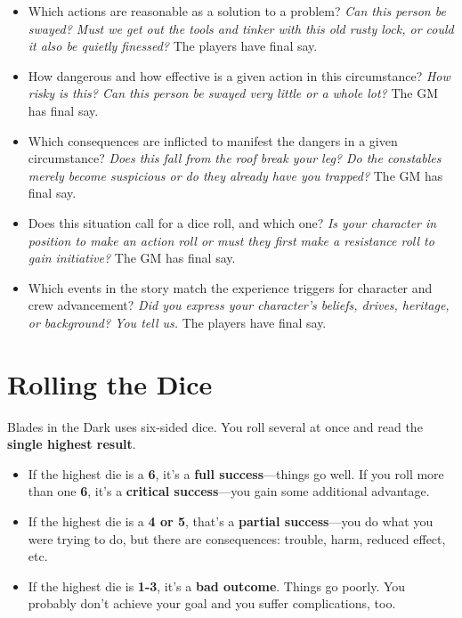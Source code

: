 \documentclass[11pt,oneside]{book}
\begin{document}
\begin{itemize}
	\item Which actions are reasonable as a solution to a problem? \emph{Can this person be swayed? Must we get out the tools and tinker with this old rusty lock, or could it also be quietly finessed?} The players have final say.
	\item How dangerous and how effective is a given action in this circumstance? \emph{How risky is this? Can this person be swayed very little or a whole lot?} The GM has final say.
	\item Which consequences are inflicted to manifest the dangers in a given circumstance? \emph{Does this fall from the roof break your leg? Do the constables merely become suspicious or do they already have you trapped?} The GM has final say.
	\item Does this situation call for a dice roll, and which one? \emph{Is your character in position to make an action roll or must they first make a resistance roll to gain initiative?} The GM has final say.
	\item Which events in the story match the experience triggers for character and crew advancement? \emph{Did you express your character’s beliefs, drives, heritage, or background? You tell us.} The players have final say.
\end{itemize}

\section{Rolling the Dice}

Blades in the Dark uses six-sided dice. You roll several at once and read the \textbf{single highest result}.

\begin{itemize}
	\item If the highest die is a \textbf{6}, it’s a \textbf{full success}---things go well. If you roll more than one \textbf{6}, it’s a \textbf{critical success}---you gain some additional advantage.
	\item If the highest die is a \textbf{4 or 5}, that’s a \textbf{partial success}---you do what you were trying to do, but there are consequences: trouble, harm, reduced effect, etc.
	\item If the highest die is \textbf{1-3}, it’s a \textbf{bad outcome}. Things go poorly. You probably don’t achieve your goal and you suffer complications, too.
\end{itemize}
\end{document}
